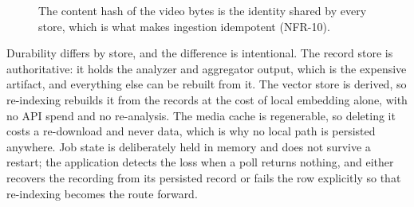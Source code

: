 \begin{figure}[htbp]
\centering
{}
\caption{The content hash of the video bytes is the identity shared by every store, which
is what makes ingestion idempotent (NFR-10).}
\label{fig:keys}
\end{figure}

Durability differs by store, and the difference is intentional. The record store is
authoritative: it holds the analyzer and aggregator output, which is the expensive
artifact, and everything else can be rebuilt from it. The vector store is derived, so
re-indexing rebuilds it from the records at the cost of local embedding alone, with no
API spend and no re-analysis. The media cache is regenerable, so deleting it costs a
re-download and never data, which is why no local path is persisted anywhere. Job state
is deliberately held in memory and does not survive a restart; the application detects
the loss when a poll returns nothing, and either recovers the recording from its
persisted record or fails the row explicitly so that re-indexing becomes the route
forward.
